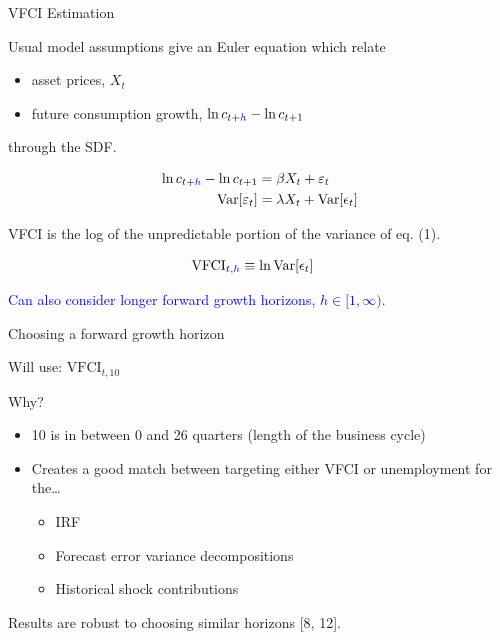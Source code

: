 \begin{frame}{VFCI Estimation}

  Usual model assumptions give an Euler equation which relate
  \begin{itemize}
    \item asset prices, $X_t$
    \item future consumption growth, $\ln c_{t+\textcolor{blue}{h}} - \ln c_{t+1}$
  \end{itemize}
  through the SDF.

  \vspace{-1cm}
  \setcounter{equation}{0}
  \begin{align}
    \ln c_{t+\textcolor{blue}{h}} - \ln c_{t+1} &= \beta X_t + \varepsilon_t
    \\
    \text{Var}[\varepsilon_t] &= \lambda X_t + \text{Var}[\epsilon_t]
  \end{align}

  VFCI is the log of the unpredictable portion of the variance of eq. (1).

  \vspace{-1cm}
  \begin{align*}
    \text{VFCI}_{t,\textcolor{blue}{h}} &\equiv \ln \text{Var}[\epsilon_t]
  \end{align*}

  \textcolor{blue}{Can also consider longer forward growth horizons, $h \in [1,\infty)$.}

\end{frame}

\begin{frame}{Choosing a forward growth horizon}

  Will use: $\text{VFCI}_{t, 10}$

  Why?
  \begin{itemize}
    \item 10 is in between 0 and 26 quarters (length of the business cycle)
  
    \item Creates a good match between targeting either VFCI or unemployment for the\dots
    \begin{itemize}
      \item IRF
      \item Forecast error variance decompositions
      \item Historical shock contributions
    \end{itemize}
    
  \end{itemize}

  Results are robust to choosing similar horizons [8, 12].

\end{frame}